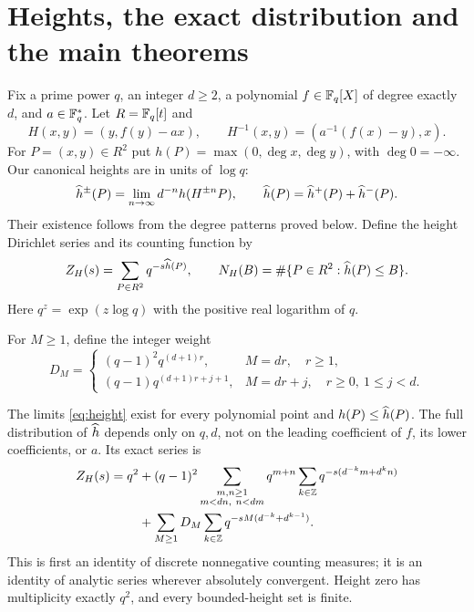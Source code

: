 \section{Heights, the exact distribution and the main theorems}\label{sec:statements}
Fix a prime power $q$, an integer $d\ge2$, a polynomial
$f\in\mathbb F_q[X]$ of degree exactly $d$, and $a\in\mathbb F_q^*$.
Let $R=\mathbb F_q[t]$ and
\begin{equation}\label{eq:map}
 H(x,y)=(y,f(y)-a x),\qquad
 H^{-1}(x,y)=(a^{-1}(f(x)-y),x).
\end{equation}
For $P=(x,y)\in R^2$ put $h(P)=\max(0,\deg x,\deg y)$,
with $\deg0=-\infty$. Our canonical heights are in units of
$\log q$:
\begin{equation}\label{eq:height}
 \widehat h^\pm(P)=\lim_{n\to\infty}d^{-n}h(H^{\pm n}P),\qquad
 \widehat h(P)=\widehat h^+(P)+\widehat h^-(P).
\end{equation}
Their existence follows from the degree patterns proved below.
Define the height Dirichlet series and its counting function by
\begin{equation}\label{eq:def-series}
 Z_H(s)=\sum_{P\in R^2}q^{-s\widehat h(P)},\qquad
 N_H(B)=\#\{P\in R^2:\widehat h(P)\le B\}.
\end{equation}
Here $q^z=\exp(z\log q)$ with the positive real logarithm of $q$.

For $M\ge1$, define the integer weight
\begin{equation}\label{eq:turn-weights}
 D_M=\begin{cases}
 (q-1)^2q^{(d+1)r},&M=dr,\quad r\ge1,\\
 (q-1)q^{(d+1)r+j+1},&M=dr+j,\quad r\ge0,\ 1\le j<d.
 \end{cases}
\end{equation}

\begin{theorem}\label{thm:distribution}
The limits \eqref{eq:height} exist for every polynomial point and
$h(P)\le\widehat h(P)$. The full distribution of $\widehat h$ depends only
on $q,d$, not on the leading coefficient of $f$, its lower
coefficients, or $a$. Its exact series is
\begin{align}\label{eq:positive-series}
 Z_H(s)=q^2
 &+(q-1)^2\sum_{\substack{m,n\ge1\\m<dn,\ n<dm}}
 q^{m+n}\sum_{k\in\mathbb Z}q^{-s(d^{-k}m+d^kn)}\notag\\
 &+\sum_{M\ge1}D_M\sum_{k\in\mathbb Z}
 q^{-sM(d^{-k}+d^{k-1})}.
\end{align}
This is first an identity of discrete nonnegative counting measures;
it is an identity of analytic series wherever absolutely convergent.
Height zero has multiplicity exactly $q^2$, and every bounded-height
set is finite.
\end{theorem}

